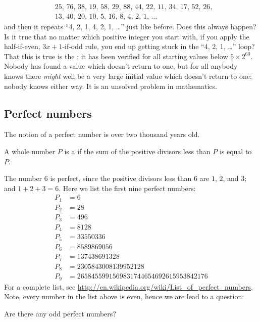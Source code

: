 \documentclass{ximera}
\begin{document}
\begin{example}
  \begin{align*}
    &25,\, 76,\, 38,\, 19,\, 58,\, 29,\, 88,\, 44,\, 22,\, 11,\, 34,\, 17,\, 52,\, 26, \\
    &13,\, 40,\, 20,\, 10,\, 5,\, 16,\, 8,\, 4,\, 2, \, 1, \, \ldots
  \end{align*}
  and then it repeats ``4, 2, 1, 4, 2, 1, \ldots'' just like before.
  Does this always happen?  Is it true that no matter which positive
  integer you start with, if you apply the half-if-even, $3x+1$-if-odd
  rule, you end up getting stuck in the ``4, 2, 1, \ldots'' loop?
  That this is true is the ; it has been
  verified for all starting values below $5 \times 2^{60}$.  Nobody
  has found a value which doesn't return to one, but for all anybody
  knows there \textit{might} well be a very large initial value which
  doesn't return to one; nobody knows either way.  It is an unsolved
  problem in mathematics.
\end{example}


\subsection{Perfect numbers}

The notion of a perfect number is over two thousand years old.

\begin{definition}
  A whole number $P$ is a  if the sum of the
  positive divisors less than $P$ is equal to $P$.
\end{definition}
The number $6$ is perfect, since the positive divisors less than $6$
are $1$, $2$, and $3$; and $1+2+3 = 6$.  Here we list the first nine
perfect numbers:
\begin{align*}
P_1 &= 6\\
P_2 &= 28\\
P_3 &= 496\\
P_4 &= 8128\\
P_5 &= 33550336\\
P_6 &= 8589869056\\
P_7 &= 137438691328\\
P_8 &= 2305843008139952128\\
P_9 &= 2658455991569831744654692615953842176
\end{align*}
For a complete list, see
\url{http://en.wikipedia.org/wiki/List_of_perfect_numbers}.  Note,
every number in the list above is even, hence we are lead to a question:


\begin{question}
  Are there any odd perfect numbers?
  \begin{prompt}
    \begin{multipleChoice}
    \end{multipleChoice}
  \end{prompt}
\end{question}
\end{document}

